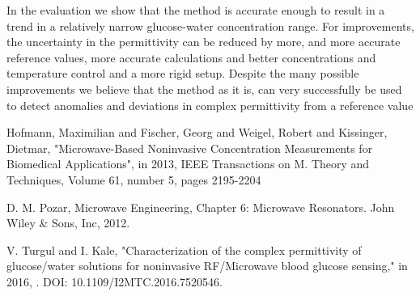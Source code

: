 \documentclass[10pt,final,conference,a4paper,twocolumn]{IEEEtran_AntennEMB_GigaHertz2016}
\begin{document}
In the evaluation we show that the method is accurate enough to result in a trend in a relatively narrow glucose-water concentration range. For improvements, the uncertainty in the permittivity can be reduced by more, and more accurate reference values, more accurate calculations and better concentrations and temperature control and a more rigid setup. Despite the many possible improvements we believe that the method as it is, can very successfully be used to detect anomalies and deviations in complex permittivity from a reference value







%
%


\begin{thebibliography}{99}
	
	
	
	 Hofmann, Maximilian and Fischer, Georg and Weigel, Robert and Kissinger, Dietmar, "Microwave-Based Noninvasive Concentration Measurements for Biomedical Applications", in 2013, IEEE Transactions on M. Theory and Techniques, Volume 61, number 5, pages 2195-2204
	
	 D. M. Pozar, Microwave Engineering, Chapter 6: Microwave Resonators. John Wiley \& Sons,
	Inc, 2012.
	
	 V. Turgul and I. Kale, "Characterization of the complex permittivity of glucose/water solutions for noninvasive RF/Microwave blood glucose sensing," in 2016, . DOI: 10.1109/I2MTC.2016.7520546.
\end{thebibliography}
\end{document}

